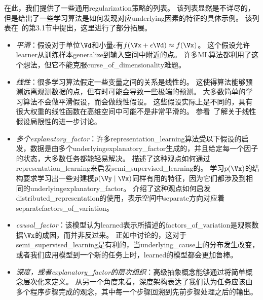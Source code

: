 在此，我们提供了一些通用\gls{regularization}策略的列表。
该列表显然是不详尽的，但是给出了一些学习算法是如何发现对应\gls{underlying}因素的特征的具体示例。
该列表在~\cite{Bengio-Courville-Vincent-TPAMI-2012}的第3.1节中提出，这里进行了部分拓展。
\begin{itemize}
	\item \emph{平滑}：假设对于单位$\Vd$和小量$\epsilon$有$f(\Vx + \epsilon \Vd) \approx f(\Vx)$。
	这个假设允许\gls{learner}从训练样本\gls{generalize}到输入空间中附近的点。
	许多\gls{ML}算法都利用了这个想法，但它不能克服\gls{curse_of_dimensionality}难题。


	\item \emph{线性}：很多学习算法假定一些变量之间的关系是线性的。
	这使得算法能够预测远离观测数据的点，但有时可能会导致一些极端的预测。
	大多数简单的学习算法不会做平滑假设，而会做线性假设。
	这些假设实际上是不同的，具有很大权重的线性函数在高维空间中可能不是非常平滑的。
	参看~\cite{Goodfellow-2015-adversarial}了解关于线性假设局限性的进一步讨论。


	\item \emph{多个\gls{explanatory_factor}}：许多\gls{representation_learning}算法受以下假设的启发，数据是由多个\gls{underlying}\gls{explanatory_factor}生成的，并且给定每一个因子的状态，大多数任务都能轻易解决。
	描述了这种观点如何通过\gls{representation_learning}来启发\gls{semi_supervised_learning}的。
	学习$p(\Vx)$的结构要求学习出一些对建模$p(\Vy\mid\Vx)$同样有用的特征，因为它们都涉及到相同的\gls{underlying}\gls{explanatory_factor}。
	介绍了这种观点如何启发\gls{distributed_representation}的使用，表示空间中\gls{separate}方向对应着\gls{separate}\gls{factors_of_variation}。


	\item \emph{\gls{causal_factor}}：该模型认为\gls{learned}表示所描述的\gls{factors_of_variation}是观察数据$\Vx$的成因，而并非反过来。
	正如中讨论的，这对于\gls{semi_supervised_learning}是有利的，当\gls{underlying_cause}上的分布发生改变，或者我们应用模型到一个新的任务上时，\gls{learned}的模型都会更加鲁棒。


	\item \emph{深度，或者\gls{explanatory_factor}的层次组织}：高级抽象概念能够通过将简单概念层次化来定义。
	从另一个角度来看，深度架构表达了我们认为任务应该由多个程序步骤完成的观念，其中每一个步骤回溯到先前步骤处理之后的输出。



\end{itemize}
